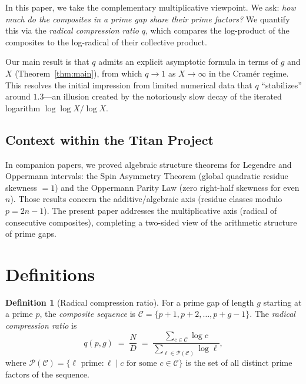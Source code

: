 \documentclass[11pt, a4paper]{article}
\theoremstyle{definition}
\newtheorem{definition}[theorem]{Definition}
\theoremstyle{remark}
\begin{document}
In this paper, we take the complementary multiplicative
viewpoint.
We ask: \emph{how much do the composites in a prime gap
share their prime factors?}
We quantify this via the \emph{radical compression ratio}
$q$, which compares the log-product of the composites to
the log-radical of their collective product.

Our main result is that $q$ admits an explicit asymptotic
formula in terms of $g$ and $X$ (Theorem~\ref{thm:main}),
from which $q \to 1$ as $X \to \infty$ in the
Cram\'er regime.
This resolves the initial impression from limited numerical
data that $q$ ``stabilizes'' around $1.3$---an illusion
created by the notoriously slow decay of the iterated
logarithm $\log\log X / \log X$.

\subsection{Context within the Titan Project}

In companion papers, we proved algebraic structure theorems
for Legendre and Oppermann intervals:
the Spin Asymmetry Theorem \cite{ChenSpin}
(global quadratic residue skewness $= 1$)
and the Oppermann Parity Law \cite{ChenOpp}
(zero right-half skewness for even $n$).
Those results concern the additive/algebraic axis
(residue classes modulo $p = 2n - 1$).
The present paper addresses the multiplicative axis
(radical of consecutive composites), completing a
two-sided view of the arithmetic structure of prime gaps.

\section{Definitions}\label{sec:definitions}

\begin{definition}[Radical compression ratio]\label{def:q}
For a prime gap of length $g$ starting at a prime $p$,
the \emph{composite sequence} is
$\mathcal{C} = \{p+1, p+2, \ldots, p+g-1\}$.
The \emph{radical compression ratio} is
\begin{equation}\label{eq:q}
    q(p, g)
    \;=\;
    \frac{N}{D}
    \;=\;
    \frac{\displaystyle\sum_{c \in \mathcal{C}} \log c}
    {\displaystyle\sum_{\ell \in \mathcal{P}(\mathcal{C})} \log \ell},
\end{equation}
where $\mathcal{P}(\mathcal{C})
= \{\ell \text{ prime} : \ell \mid c \text{ for some }
c \in \mathcal{C}\}$
is the set of all distinct prime factors of the sequence.
\end{definition}
\end{document}
